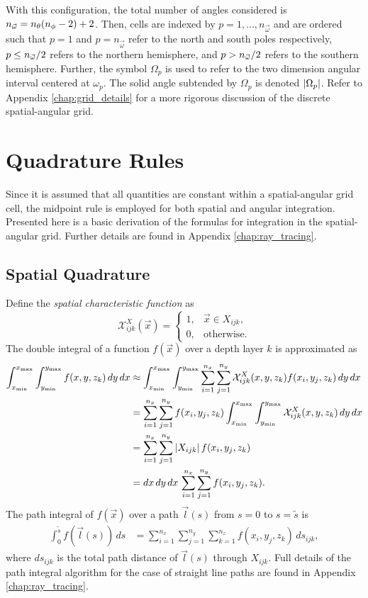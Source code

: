 With this configuration, the total number of angles considered is ${n_{\vec{\omega}}} = n_\theta(n_\phi-2)+2$.
Then, cells are indexed by $p=1,\ldots,n_{\vec{\omega}}$ and are ordered such that
$p=1$ and $p=n_{\vec{\omega}}$ refer to the north and south poles respectively,
$p\leq{n_{\vec{\omega}}}/2$ refers to the northern hemisphere, and $p>{n_{\vec{\omega}}}/2$ refers to the southern hemisphere.
Further, the symbol $\Omega_p$ is used to refer to the two dimension angular interval centered at $\omega_p$.
The solid angle subtended by $\Omega_p$ is denoted $\left| \Omega_p \right|$.
Refer to Appendix \ref{chap:grid_details} for a more rigorous discussion of the discrete spatial-angular grid.

\section{Quadrature Rules}
Since it is assumed that all quantities are constant within a spatial-angular grid cell,
the midpoint rule is employed for both spatial and angular integration.
Presented here is a basic derivation of the formulas for integration in the spatial-angular grid.
Further details are found in Appendix \ref{chap:ray_tracing}.

\subsection{Spatial Quadrature}
Define the \textit{spatial characteristic function} as
\begin{equation*}
  \mathcal{X}^X_{ijk}(\vec{x}) = \begin{cases}
    1, & \vec{x} \in X_{ijk}, \\
    0, & \mbox{otherwise}.
  \end{cases}
\end{equation*}
The double integral of a function $f(\vec{x})$ over a depth layer $k$ is approximated as
\begin{align*}
  \int_{x_{\min}}^{x_{\max}}\int_{y_{\min}}^{y_{\max}} f(x, y, z_k)\, dy\, dx &\approx \int_{x_{\min}}^{x_{\max}} \int_{y_{\min}}^{y_{\max}} \sum_{i=1}^{n_x}\sum_{j=1}^{n_y} \mathcal{X}^X_{ijk}(x,y,z_k) f(x_i, y_j, z_k)\, dy\, dx \\
  &= \sum_{i=1}^{n_x}\sum_{j=1}^{n_y} f(x_i, y_j, z_k) \int_{x_{\min}}^{x_{\max}} \int_{y_{\min}}^{y_{\max}} \mathcal{X}^X_{ijk}(x,y,z_k) \, dy\, dx \\
  &= \sum_{i=1}^{n_x}\sum_{j=1}^{n_y} \left| X_{ijk} \right| f(x_i, y_j, z_k) \\
  &= dx\, dy\, dx\, \sum_{i=1}^{n_x}\sum_{j=1}^{n_y} f(x_i, y_j, z_k).
\end{align*}
The path integral of $f(\vec{x})$ over a path $\vec{l}(s)$ from $s=0$ to $s=\tilde{s}$ is
\begin{align*}
  \int_0^{\tilde{s}} f(\vec{l}(s))\, ds &= \sum_{i=1}^{n_x}\sum_{j=1}^{n_y}\sum_{k=1}^{n_z} f(x_i, y_j, z_k)\, ds_{ijk},
\end{align*}
where $ds_{ijk}$ is the total path distance of $\vec{l}(s)$ through $X_{ijk}$.
Full details of the path integral algorithm for the case of straight line paths are found in Appendix \ref{chap:ray_tracing}.

